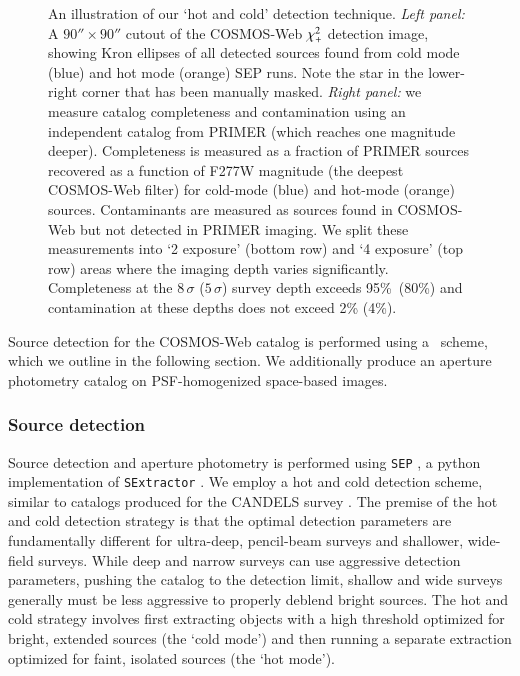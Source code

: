 \documentclass[longauth]{aa}
\begin{document}
\begin{figure}[t!]
\caption{An illustration of our `hot and cold' detection technique.  \textit{Left panel:} A $90''\times 90''$ cutout of the COSMOS-Web $\chi^2_{\rm +}$ detection image, showing Kron ellipses of all detected sources found from cold mode (blue) and hot mode (orange) SEP runs.  Note the star in the lower-right corner that has been manually masked. \textit{Right panel:}  we measure catalog completeness and contamination using  an independent catalog from PRIMER (which reaches one magnitude deeper).  Completeness is measured as a fraction of PRIMER sources recovered as a function of F277W magnitude (the deepest COSMOS-Web filter) for cold-mode (blue) and hot-mode (orange) sources. Contaminants are measured as sources found in COSMOS-Web but not detected in PRIMER imaging.  We split these measurements into `2 exposure' (bottom row) and `4 exposure' (top row) areas where the imaging depth varies significantly. Completeness at the $8\,\sigma$ ($5\,\sigma$) survey depth exceeds 95\%\ (80\%) and contamination at these depths does not exceed 2\% (4\%).}
\label{fig:hotcold}
\end{figure}


Source detection for the COSMOS-Web catalog is performed using a \hotcold\ scheme, which we outline in the following section. 
We additionally produce an aperture photometry catalog on PSF-homogenized space-based images. 

\subsubsection{Source detection} \label{sec:hotcold-detection}



Source detection and aperture photometry is performed using \texttt{SEP} \citep{K.Barbary2016}, a python implementation of \texttt{SExtractor} \citep{bertin_sextractor_1996}. 
We employ a hot and cold detection scheme, similar to catalogs produced for the CANDELS survey \citep[e.g.,][]{galametz2013, guo2013, nayyeri_candels_2017, stefanon2017}. 
The premise of the hot and cold detection strategy is that the optimal detection parameters are fundamentally different for ultra-deep, pencil-beam surveys and shallower, wide-field surveys. While deep and narrow surveys can use aggressive detection parameters, pushing the catalog to the detection limit, shallow and wide surveys generally must be less aggressive to properly deblend bright sources. The hot and cold strategy involves first extracting objects with a high threshold optimized for bright, extended sources (the `cold mode') and then running a separate extraction optimized for faint, isolated sources (the `hot mode'). 
\end{document}
